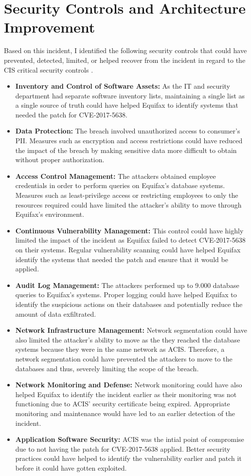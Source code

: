 \chapter{Security Controls and Architecture Improvement}

Based on this incident, I identified the following security controls that could have prevented, detected, limited, or helped recover from the incident in regard to the CIS critical security controls \cite{cis}.
\begin{itemize}
\item \textbf{Inventory and Control of Software Assets:} As the IT and security department had separate software inventory lists, maintaining a single list as a single source of truth could have helped Equifax to identify systems that needed the patch for CVE-2017-5638.
\item \textbf{Data Protection:} The breach involved unauthorized access to consumer's PII. Measures such as encryption and access restrictions could have reduced the impact of the breach by making sensitive data more difficult to obtain without proper authorization.
\item \textbf{Access Control Management:} The attackers obtained employee credentials in order to perform queries on Equifax's database systems. Measures such as least-privilege access or restricting employees to only the resources required could have limited the attacker's ability to move through Equifax's environment.
\item \textbf{Continuous Vulnerability Management:} This control could have highly limited the impact of the incident as Equifax failed to detect CVE-2017-5638 on their systems. Regular vulnerability scanning could have helped Equifax identify the systems that needed the patch and ensure that it would be applied.
\item \textbf{Audit Log Management:} The attackers performed up to 9.000 database queries to Equifax's systems. Proper logging could have helped Equifax to identify the suspicious actions on their databases and potentially reduce the amount of data exfiltrated.
\item \textbf{Network Infrastructure Management:} Network segmentation could have also limited the attacker's ability to move as the they reached the database systems because they were in the same network as ACIS. Therefore, a network segmentation could have prevented the attackers to move to the databases and thus, severely limiting the scope of the breach.
\item \textbf{Network Monitoring and Defense:} Network monitoring could have also helped Equifax to identify the incident earlier as their monitoring was not functioning due to ACIS' security certificate being expired. Appropriate monitoring and maintenance would have led to an earlier detection of the incident.
\item \textbf{Application Software Security:} ACIS was the intial point of compromise due to not having the patch for CVE-2017-5638 applied. Better security practices could have helped to identify the vulnerability earlier and patch it before it could have gotten exploited.
\end{itemize}